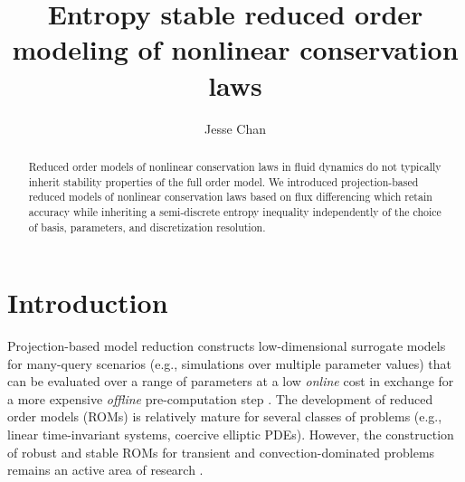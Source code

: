 \documentclass[preprint,10pt]{elsarticle}
\theoremstyle{definition}
\theoremstyle{lemma}
\theoremstyle{theorem}
\theoremstyle{assumption}
\begin{document}
\begin{frontmatter}
\title{Entropy stable reduced order modeling of nonlinear conservation laws}

\author[rice]{Jesse Chan}
\address[rice]{Department of Computational and Applied Mathematics, Rice University, 6100 Main St, Houston, TX, 77005}

\begin{abstract}
Reduced order models of nonlinear conservation laws in fluid dynamics do not typically inherit stability properties of the full order model. We introduced projection-based reduced models of nonlinear conservation laws based on flux differencing which retain accuracy while inheriting a semi-discrete entropy inequality independently of the choice of basis, parameters, and discretization resolution. 
\end{abstract}
\end{frontmatter}



\section{Introduction}

Projection-based model reduction constructs low-dimensional surrogate models for many-query scenarios (e.g., simulations over multiple parameter values) that can be evaluated over a range of parameters at a low \textit{online} cost in exchange for a more expensive \textit{offline} pre-computation step \cite{benner2015survey}.  The development of reduced order models (ROMs) is relatively mature for several classes of problems (e.g., linear time-invariant systems, coercive elliptic PDEs).  However, the construction of robust and stable ROMs for transient and convection-dominated problems remains an active area of research \cite{cagniart2019model}.  
\end{document}

